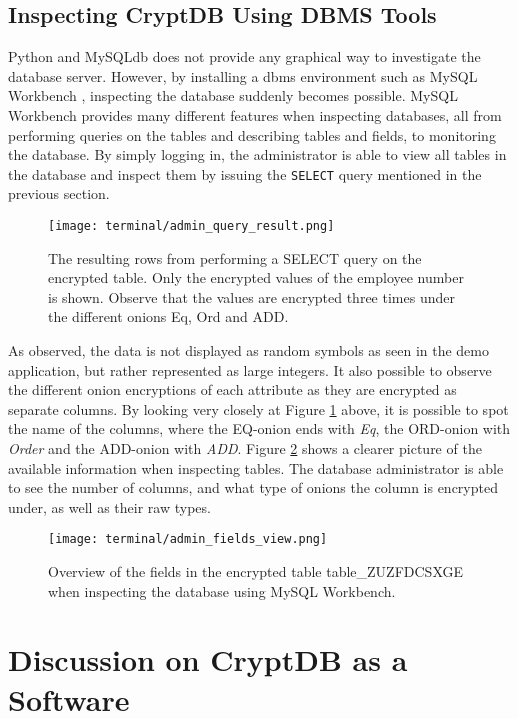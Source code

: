 \newpage
\subsection{Inspecting CryptDB Using DBMS Tools}

Python and MySQLdb does not provide any graphical way to investigate the database server. However, by installing a \gls{dbms} environment such as MySQL Workbench \cite{mysql_workbench}, inspecting the database suddenly becomes possible. MySQL Workbench provides many different features when inspecting databases, all from performing queries on the tables and describing tables and fields, to 
monitoring the database. By simply logging in, the administrator is able to view all tables in the database and inspect them by issuing the \verb!SELECT! query mentioned in the previous section.

\begin{figure}[h]
	\centering
	\texttt{[image: terminal/admin\_query\_result.png]}
	\caption{The resulting rows from performing a SELECT query on the encrypted table. Only the encrypted values of the employee number is shown. Observe that the values are encrypted three times under the different onions Eq, Ord and ADD.}
	\label{fig:admin_query_result}
\end{figure}

As observed, the data is not displayed as random symbols as seen in the demo application, but rather represented as large integers. It also possible to observe the different onion encryptions of each attribute as they are encrypted as separate columns. By looking very closely at Figure \ref{fig:admin_query_result} above, it is possible to spot the name of the columns, where the EQ-onion ends with \emph{Eq}, the ORD-onion with \emph{Order} and the ADD-onion with \emph{ADD}. Figure \ref{fig:admin_fields_view} shows a clearer picture of the available information when inspecting tables. The database administrator is able to see the number of columns, and what type of onions the column is encrypted under, as well as their raw types.

\begin{figure}[h]
	\centering
	\texttt{[image: terminal/admin\_fields\_view.png]}
	\caption{Overview of the fields in the encrypted table table\_ZUZFDCSXGE when inspecting the database using MySQL Workbench.}
	\label{fig:admin_fields_view}
\end{figure}

\section{Discussion on CryptDB as a Software}

